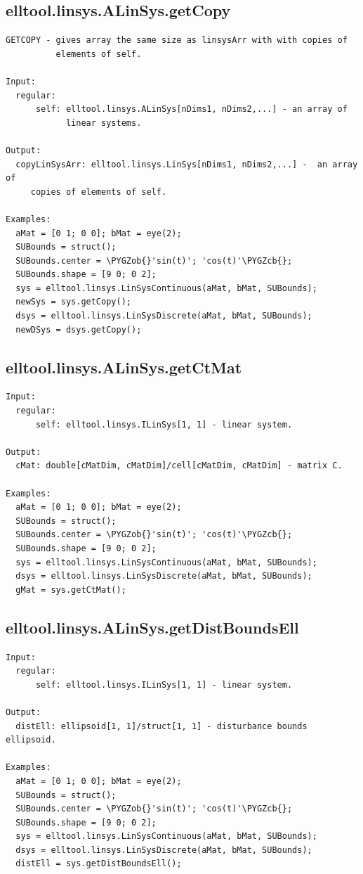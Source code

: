 \documentclass[letterpaper,10pt,english]{sphinxmanual}
\def\PYGZob{\char`\{}
\def\PYGZcb{\char`\}}
\begin{document}
\subsection{elltool.linsys.ALinSys.getCopy}
\label{chap_functions:elltool-linsys-alinsys-getcopy}
\begin{Verbatim}[commandchars=\\\{\}]
GETCOPY - gives array the same size as linsysArr with with copies of
          elements of self.

Input:
  regular:
      self: elltool.linsys.ALinSys[nDims1, nDims2,...] - an array of
            linear systems.

Output:
  copyLinSysArr: elltool.linsys.LinSys[nDims1, nDims2,...] -  an array of
     copies of elements of self.

Examples:
  aMat = [0 1; 0 0]; bMat = eye(2);
  SUBounds = struct();
  SUBounds.center = \PYGZob{}'sin(t)'; 'cos(t)'\PYGZcb{};
  SUBounds.shape = [9 0; 0 2];
  sys = elltool.linsys.LinSysContinuous(aMat, bMat, SUBounds);
  newSys = sys.getCopy();
  dsys = elltool.linsys.LinSysDiscrete(aMat, bMat, SUBounds);
  newDSys = dsys.getCopy();
\end{Verbatim}


\subsection{elltool.linsys.ALinSys.getCtMat}
\label{chap_functions:elltool-linsys-alinsys-getctmat}
\begin{Verbatim}[commandchars=\\\{\}]
Input:
  regular:
      self: elltool.linsys.ILinSys[1, 1] - linear system.

Output:
  cMat: double[cMatDim, cMatDim]/cell[cMatDim, cMatDim] - matrix C.

Examples:
  aMat = [0 1; 0 0]; bMat = eye(2);
  SUBounds = struct();
  SUBounds.center = \PYGZob{}'sin(t)'; 'cos(t)'\PYGZcb{};
  SUBounds.shape = [9 0; 0 2];
  sys = elltool.linsys.LinSysContinuous(aMat, bMat, SUBounds);
  dsys = elltool.linsys.LinSysDiscrete(aMat, bMat, SUBounds);
  gMat = sys.getCtMat();
\end{Verbatim}


\subsection{elltool.linsys.ALinSys.getDistBoundsEll}
\label{chap_functions:elltool-linsys-alinsys-getdistboundsell}
\begin{Verbatim}[commandchars=\\\{\}]
Input:
  regular:
      self: elltool.linsys.ILinSys[1, 1] - linear system.

Output:
  distEll: ellipsoid[1, 1]/struct[1, 1] - disturbance bounds ellipsoid.

Examples:
  aMat = [0 1; 0 0]; bMat = eye(2);
  SUBounds = struct();
  SUBounds.center = \PYGZob{}'sin(t)'; 'cos(t)'\PYGZcb{};
  SUBounds.shape = [9 0; 0 2];
  sys = elltool.linsys.LinSysContinuous(aMat, bMat, SUBounds);
  dsys = elltool.linsys.LinSysDiscrete(aMat, bMat, SUBounds);
  distEll = sys.getDistBoundsEll();
\end{Verbatim}
\end{document}
